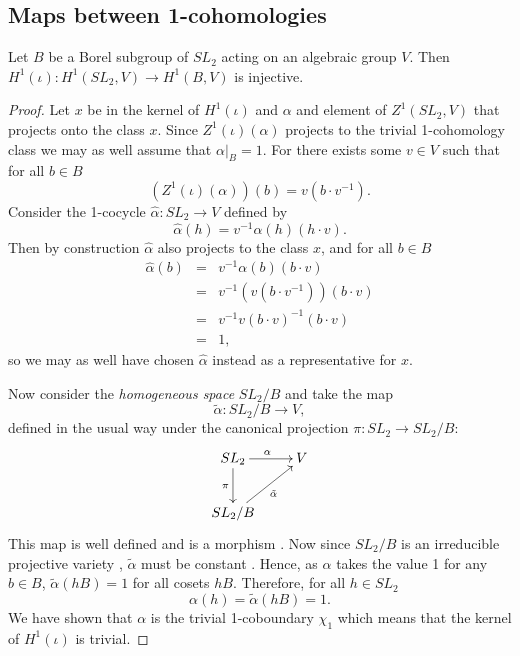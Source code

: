 \subsection{Maps between 1-cohomologies}
\begin{lemma} Let $B$ be a Borel subgroup of $SL_2$ acting on an algebraic group $V$. Then $H^1(\iota):H^1(SL_2, V)\rightarrow H^1(B, V)$ is injective.
\end{lemma}
\begin{proof}
Let $x$ be in the kernel of $H^1(\iota)$ and $\alpha$ and element of $Z^1(SL_2, V)$ that projects onto the class $x$. Since $Z^1(\iota)(\alpha)$ projects to the trivial 1-cohomology class we may as well assume that $\alpha|_B = 1$. For there exists some $v \in V$ such that for all $b \in B$
\begin{displaymath}
	\left(Z^1(\iota)(\alpha) \right)(b) = v (b \cdot v^{-1}).
\end{displaymath}
Consider the 1-cocycle $\hat{\alpha}:SL_2\rightarrow V$ defined by
\begin{displaymath}
	\hat{\alpha}(h) = v^{-1} \alpha(h) (h \cdot v).
\end{displaymath}
Then by construction $\hat{\alpha}$ also projects to the class $x$, and for all $b \in B$
\begin{eqnarray*}
	\hat{\alpha}(b) &=& v^{-1} \alpha(b) (b \cdot v) \\
	&=& v^{-1} (v (b\cdot v^{-1})) (b \cdot v)\\
	&=& v^{-1} v (b\cdot v)^{-1} (b \cdot v)\\
	&=& 1,
\end{eqnarray*}
so we may as well have chosen $\hat{\alpha}$ instead as a representative for $x$. 

Now consider the \emph{homogeneous space} $SL_2/B$ \cite{humphreys1975linear} and take the map 
\begin{displaymath}
	\tilde{\alpha}:SL_2/B \rightarrow V,
\end{displaymath}
defined in the usual way under the canonical projection $\pi:SL_2 \rightarrow SL_2/B$:
\begin{displaymath}
	\xymatrix{
	SL_2 \ar[r]^{\alpha} \ar[d]_{\pi} & V\\
	SL_2/B \ar[ru]_{\tilde{\alpha}}
	}
\end{displaymath}
This map is well defined and is a morphism \cite{borel1991linear}. Now since $SL_2/B$ is an irreducible projective variety \cite[Theorem 21.3]{humphreys1975linear}, $\tilde{\alpha}$ must be constant  \cite{borel1991linear}. Hence, as $\alpha$ takes the value 1 for any $b \in B$, $\tilde{\alpha}(hB) = 1$ for all cosets $hB$. Therefore, for all $h \in SL_2$
\begin{displaymath}
	\alpha(h) = \tilde{\alpha}(hB) = 1.
\end{displaymath}
We have shown that $\alpha$ is the trivial 1-coboundary $\chi_1$ which means that the kernel of $H^1(\iota)$ is trivial.
\end{proof} 


